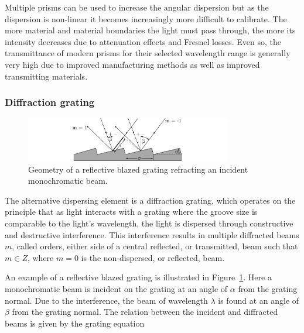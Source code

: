Multiple prisms can be used to increase the angular dispersion but as the dispersion is non-linear it becomes increasingly more difficult to calibrate. The more material and material boundaries the light must pass through, the more its intensity decreases due to attenuation effects and Fresnel losses. Even so, the transmittance of modern prisms for their selected wavelength range is generally very high\footnotemark{} due to improved manufacturing methods as well as improved transmitting materials.
\enlargethispage{-2\baselineskip}

\subsubsection{Diffraction grating}

\begin{figure}[t]
    \centering
    \includegraphics[width = 9cm]{figures/2_grating_diagram.pdf}
    \caption{Geometry of a reflective blazed grating refracting an incident monochromatic beam.}
    \label{fig:grating_diagram}
\end{figure}

The alternative dispersing element is a diffraction grating, which operates on the principle that as light interacts with a grating where the groove size is comparable to the light's wavelength, the light is dispersed through constructive and destructive interference. This interference results in multiple diffracted beams $m$, called orders, either side of a central reflected, or transmitted, beam such that $m \in Z$, where $m = 0$ is the non-dispersed, or reflected, beam.
\prgph

An example of a reflective blazed grating is illustrated in Figure~\ref{fig:grating_diagram}. Here a monochromatic beam is incident on the grating at an angle of $\alpha$ from the grating normal. Due to the interference, the beam of wavelength $\lambda$ is found at an angle of $\beta$ from the grating normal. The relation between the incident and diffracted beams is given by the grating equation

